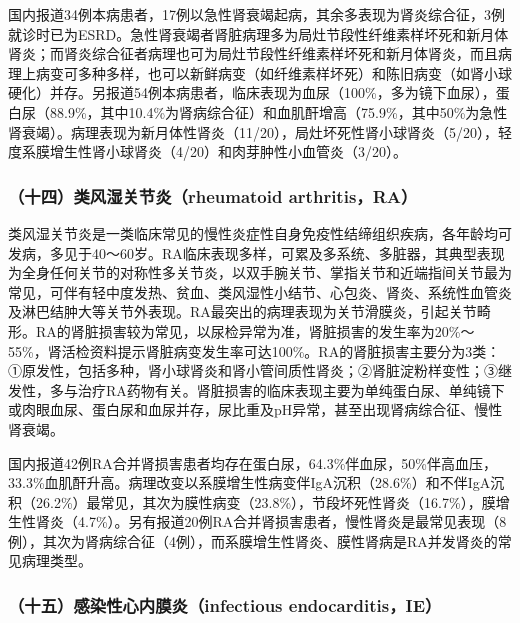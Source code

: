 国内报道34例本病患者，17例以急性肾衰竭起病，其余多表现为肾炎综合征，3例就诊时已为ESRD。急性肾衰竭者肾脏病理多为局灶节段性纤维素样坏死和新月体肾炎；而肾炎综合征者病理也可为局灶节段性纤维素样坏死和新月体肾炎，而且病理上病变可多种多样，也可以新鲜病变（如纤维素样坏死）和陈旧病变（如肾小球硬化）并存。另报道54例本病患者，临床表现为血尿（100\%，多为镜下血尿），蛋白尿（88.9\%，其中10.4\%为肾病综合征）和血肌酐增高（75.9\%，其中50\%为急性肾衰竭）。病理表现为新月体性肾炎（11/20），局灶坏死性肾小球肾炎（5/20），轻度系膜增生性肾小球肾炎（4/20）和肉芽肿性小血管炎（3/20）。

\subsubsection{（十四）类风湿关节炎（rheumatoid arthritis，RA）}

类风湿关节炎是一类临床常见的慢性炎症性自身免疫性结缔组织疾病，各年龄均可发病，多见于40～60岁。RA临床表现多样，可累及多系统、多脏器，其典型表现为全身任何关节的对称性多关节炎，以双手腕关节、掌指关节和近端指间关节最为常见，可伴有轻中度发热、贫血、类风湿性小结节、心包炎、肾炎、系统性血管炎及淋巴结肿大等关节外表现。RA最突出的病理表现为关节滑膜炎，引起关节畸形。RA的肾脏损害较为常见，以尿检异常为准，肾脏损害的发生率为20\%～55\%，肾活检资料提示肾脏病变发生率可达100\%。RA的肾脏损害主要分为3类：①原发性，包括多种，肾小球肾炎和肾小管间质性肾炎；②肾脏淀粉样变性；③继发性，多与治疗RA药物有关。肾脏损害的临床表现主要为单纯蛋白尿、单纯镜下或肉眼血尿、蛋白尿和血尿并存，尿比重及pH异常，甚至出现肾病综合征、慢性肾衰竭。

国内报道42例RA合并肾损害患者均存在蛋白尿，64.3\%伴血尿，50\%伴高血压，33.3\%血肌酐升高。病理改变以系膜增生性病变伴IgA沉积（28.6\%）和不伴IgA沉积（26.2\%）最常见，其次为膜性病变（23.8\%），节段坏死性肾炎（16.7\%），膜增生性肾炎（4.7\%）。另有报道20例RA合并肾损害患者，慢性肾炎是最常见表现（8例），其次为肾病综合征（4例），而系膜增生性肾炎、膜性肾病是RA并发肾炎的常见病理类型。

\subsubsection{（十五）感染性心内膜炎（infectious endocarditis，IE）}

